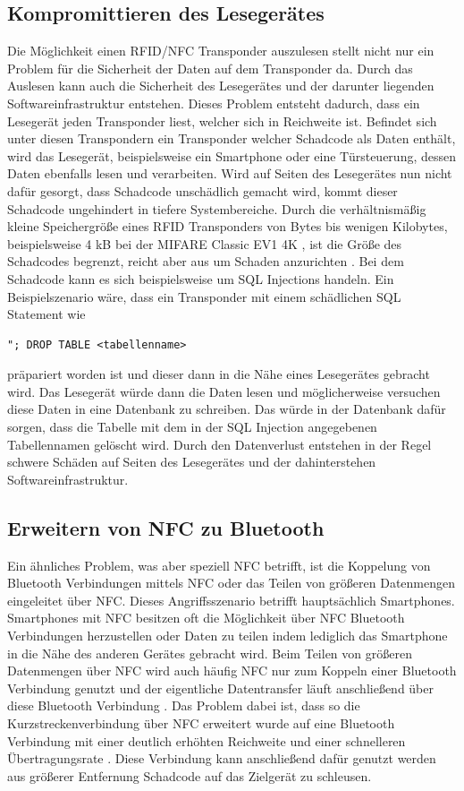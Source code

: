 \documentclass[conference]{IEEEtran}
\begin{document}
\subsection{Kom­pro­mit­tie­ren des Lesegerätes}
Die Möglichkeit einen RFID/NFC Transponder auszulesen stellt nicht nur ein Problem für die Sicherheit der Daten auf dem Transponder da. Durch das Auslesen kann auch die Sicherheit des Lesegerätes und der darunter liegenden Softwareinfrastruktur entstehen. Dieses Problem entsteht dadurch, dass ein Lesegerät jeden Transponder liest, welcher sich in Reichweite ist. Befindet sich unter diesen Transpondern ein Transponder welcher Schadcode als Daten enthält, wird das Lesegerät, beispielsweise ein Smartphone oder eine Türsteuerung, dessen Daten ebenfalls lesen und verarbeiten. Wird auf Seiten des Lesegerätes nun nicht dafür gesorgt, dass Schadcode unschädlich gemacht wird, kommt dieser Schadcode ungehindert in tiefere Systembereiche.
Durch die verhältnismäßig kleine Speichergröße eines RFID Transponders von Bytes bis wenigen Kilobytes, beispielsweise 4 kB bei der MIFARE Classic EV1 4K \cite{b4}, ist die Größe des Schadcodes begrenzt, reicht aber aus um Schaden anzurichten \cite{b5}. Bei dem Schadcode kann es sich beispielsweise um SQL Injections handeln. Ein Beispielszenario wäre, dass ein Transponder mit einem schädlichen SQL Statement wie
\begin{lstlisting}[xleftmargin=.07\textwidth, xrightmargin=.07\textwidth]
"; DROP TABLE <tabellenname>
\end{lstlisting}
\cite{b5} präpariert worden ist und dieser dann in die Nähe eines Lesegerätes gebracht wird. Das Lesegerät würde dann die Daten lesen und möglicherweise versuchen diese Daten in eine Datenbank zu schreiben. Das würde in der Datenbank dafür sorgen, dass die Tabelle mit dem in der SQL Injection angegebenen Tabellennamen gelöscht wird. Durch den Datenverlust entstehen in der Regel schwere Schäden auf Seiten des Lesegerätes und der dahinterstehen Softwareinfrastruktur.

\subsection{Erweitern von NFC zu Bluetooth}
Ein ähnliches Problem, was aber speziell NFC betrifft, ist die Koppelung von Bluetooth Verbindungen mittels NFC oder das Teilen von größeren Datenmengen eingeleitet über NFC. Dieses Angriffsszenario betrifft hauptsächlich Smartphones. Smartphones mit NFC besitzen oft die Möglichkeit über NFC Bluetooth Verbindungen herzustellen oder Daten zu teilen indem lediglich das Smartphone in die Nähe des anderen Gerätes gebracht wird. Beim Teilen von größeren Datenmengen über NFC wird auch häufig NFC nur zum Koppeln einer Bluetooth Verbindung genutzt und der eigentliche Datentransfer läuft anschließend über diese Bluetooth Verbindung \cite{b6}. Das Problem dabei ist, dass so die Kurzstreckenverbindung über NFC erweitert wurde auf eine Bluetooth Verbindung mit einer deutlich erhöhten Reichweite und einer schnelleren Übertragungsrate \cite{b6}. Diese Verbindung kann anschließend dafür genutzt werden aus größerer Entfernung Schadcode auf das Zielgerät zu schleusen.
\end{document}
